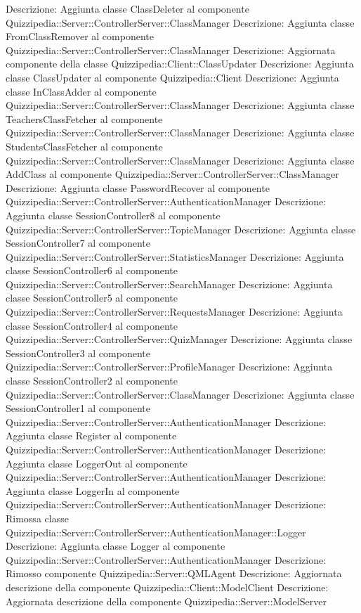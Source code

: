 Descrizione: Aggiunta classe ClassDeleter al componente Quizzipedia::Server::ControllerServer::ClassManager 
Descrizione: Aggiunta classe FromClassRemover al componente Quizzipedia::Server::ControllerServer::ClassManager 
Descrizione: Aggiornata componente della classe Quizzipedia::Client::ClassUpdater 
Descrizione: Aggiunta classe ClassUpdater al componente Quizzipedia::Client 
Descrizione: Aggiunta classe InClassAdder al componente Quizzipedia::Server::ControllerServer::ClassManager 
Descrizione: Aggiunta classe TeachersClassFetcher al componente Quizzipedia::Server::ControllerServer::ClassManager 
Descrizione: Aggiunta classe StudentsClassFetcher al componente Quizzipedia::Server::ControllerServer::ClassManager 
Descrizione: Aggiunta classe AddClass al componente Quizzipedia::Server::ControllerServer::ClassManager 
Descrizione: Aggiunta classe PasswordRecover al componente Quizzipedia::Server::ControllerServer::AuthenticationManager 
Descrizione: Aggiunta classe SessionController8 al componente Quizzipedia::Server::ControllerServer::TopicManager 
Descrizione: Aggiunta classe SessionController7 al componente Quizzipedia::Server::ControllerServer::StatisticsManager 
Descrizione: Aggiunta classe SessionController6 al componente Quizzipedia::Server::ControllerServer::SearchManager 
Descrizione: Aggiunta classe SessionController5 al componente Quizzipedia::Server::ControllerServer::RequestsManager 
Descrizione: Aggiunta classe SessionController4 al componente Quizzipedia::Server::ControllerServer::QuizManager 
Descrizione: Aggiunta classe SessionController3 al componente Quizzipedia::Server::ControllerServer::ProfileManager 
Descrizione: Aggiunta classe SessionController2 al componente Quizzipedia::Server::ControllerServer::ClassManager 
Descrizione: Aggiunta classe SessionController1 al componente Quizzipedia::Server::ControllerServer::AuthenticationManager 
Descrizione: Aggiunta classe Register al componente Quizzipedia::Server::ControllerServer::AuthenticationManager 
Descrizione: Aggiunta classe LoggerOut al componente Quizzipedia::Server::ControllerServer::AuthenticationManager 
Descrizione: Aggiunta classe LoggerIn al componente Quizzipedia::Server::ControllerServer::AuthenticationManager 
Descrizione: Rimossa classe Quizzipedia::Server::ControllerServer::AuthenticationManager::Logger 
Descrizione: Aggiunta classe Logger al componente Quizzipedia::Server::ControllerServer::AuthenticationManager 
Descrizione: Rimosso componente Quizzipedia::Server::QMLAgent 
Descrizione: Aggiornata descrizione della componente Quizzipedia::Client::ModelClient 
Descrizione: Aggiornata descrizione della componente Quizzipedia::Server::ModelServer 
